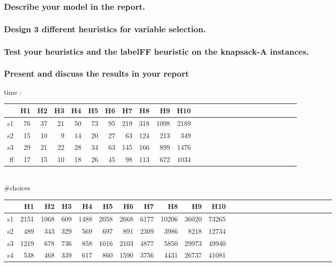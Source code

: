 \documentclass[a4paper ,12pt,french]{article}
\begin{document}
\subsubsection{Describe your model in the report.}
\subsubsection{Design 3 different heuristics for variable selection.}
\subsubsection{Test your heuristics and the labelFF heuristic on the knapsack-A instances.}
\subsubsection{Present and discuss the results in your report}




time :\\
\begin{tabular}{|r||r|r|r|r|r|r|r|r|r|r|r|r|r|r|r|r|r|r|r|r|r|r|r|r|r|}
\hline
&H1&H2&H3&H4&H5&H6&H7&H8&H9&H10\\
\hline
\hline
s1&76&37&21&50&73&95&219&318&1098&2189\\
\hline
s2&15&10&9&14&20&27&63&124&213&349\\
\hline
s3&29&21&22&28&34&63&145&166&899&1476\\
\hline
ff&17&15&10&18&26&45&98&113&672&1034\\
\hline
\end{tabular}\\

\#choices\\
\begin{tabular}{|r||r|r|r|r|r|r|r|r|r|r|r|r|r|r|r|r|r|r|r|r|r|r|r|r|r|}
\hline
&H1&H2&H3&H4&H5&H6&H7&H8&H9&H10\\
\hline
\hline
s1&2151&1068&609&1488&2058&2668&6177&10206&36020&73265\\
\hline
s2&489&343&329&569&697&891&2309&3986&8218&12734\\
\hline
s3&1219&678&736&858&1016&2103&4877&5850&29973&49940\\
\hline
s4&538&468&339&617&860&1590&3756&4431&26737&41081\\
\hline

\end{tabular}\\
\end{document}
